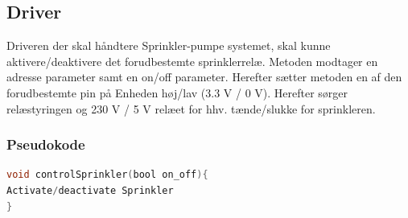 \subsection{Driver}

Driveren der skal håndtere Sprinkler-pumpe systemet, skal kunne aktivere/deaktivere det forudbestemte sprinklerrelæ. Metoden modtager en adresse parameter samt en on/off parameter. Herefter sætter metoden en af den forudbestemte pin på Enheden høj/lav (3.3 V / 0 V). Herefter sørger relæstyringen og 230 V / 5 V relæet for hhv. tænde/slukke for sprinkleren. 


\subsubsection*{Pseudokode}

\begin{lstlisting}[language=C]
void controlSprinkler(bool on_off){
Activate/deactivate Sprinkler
}
\end{lstlisting}





 